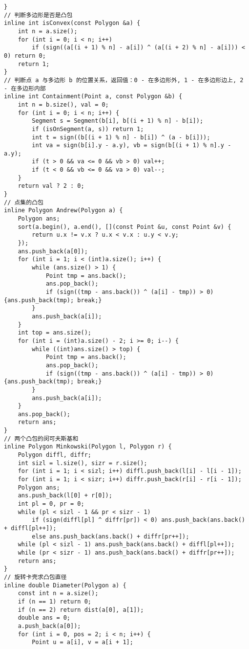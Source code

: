 \begin{verbatim}
}
// 判断多边形是否是凸包
inline int isConvex(const Polygon &a) {
    int n = a.size();
    for (int i = 0; i < n; i++)
        if (sign((a[(i + 1) % n] - a[i]) ^ (a[(i + 2) % n] - a[i])) < 0) return 0;
    return 1;
}
// 判断点 a 与多边形 b 的位置关系，返回值：0 - 在多边形外, 1 - 在多边形边上, 2 - 在多边形内部
inline int Containment(Point a, const Polygon &b) {
    int n = b.size(), val = 0;
    for (int i = 0; i < n; i++) {
        Segment s = Segment(b[i], b[(i + 1) % n] - b[i]);
        if (isOnSegment(a, s)) return 1;
        int t = sign((b[(i + 1) % n] - b[i]) ^ (a - b[i]));
        int va = sign(b[i].y - a.y), vb = sign(b[(i + 1) % n].y - a.y);
        if (t > 0 && va <= 0 && vb > 0) val++;
        if (t < 0 && vb <= 0 && va > 0) val--;
    }
    return val ? 2 : 0;
}
// 点集的凸包
inline Polygon Andrew(Polygon a) {
    Polygon ans;
    sort(a.begin(), a.end(), [](const Point &u, const Point &v) {
        return u.x != v.x ? u.x < v.x : u.y < v.y;
    });
    ans.push_back(a[0]);
    for (int i = 1; i < (int)a.size(); i++) {
        while (ans.size() > 1) {
            Point tmp = ans.back();
            ans.pop_back();
            if (sign((tmp - ans.back()) ^ (a[i] - tmp)) > 0) {ans.push_back(tmp); break;}
        }
        ans.push_back(a[i]);
    }
    int top = ans.size();
    for (int i = (int)a.size() - 2; i >= 0; i--) {
        while ((int)ans.size() > top) {
            Point tmp = ans.back();
            ans.pop_back();
            if (sign((tmp - ans.back()) ^ (a[i] - tmp)) > 0) {ans.push_back(tmp); break;}
        }
        ans.push_back(a[i]);
    }
    ans.pop_back();
    return ans;
}
// 两个凸包的闵可夫斯基和
inline Polygon Minkowski(Polygon l, Polygon r) {
    Polygon diffl, diffr;
    int sizl = l.size(), sizr = r.size();
    for (int i = 1; i < sizl; i++) diffl.push_back(l[i] - l[i - 1]);
    for (int i = 1; i < sizr; i++) diffr.push_back(r[i] - r[i - 1]);
    Polygon ans;
    ans.push_back(l[0] + r[0]);
    int pl = 0, pr = 0;
    while (pl < sizl - 1 && pr < sizr - 1)
        if (sign(diffl[pl] ^ diffr[pr]) < 0) ans.push_back(ans.back() + diffl[pl++]);
        else ans.push_back(ans.back() + diffr[pr++]);
    while (pl < sizl - 1) ans.push_back(ans.back() + diffl[pl++]);
    while (pr < sizr - 1) ans.push_back(ans.back() + diffr[pr++]);
    return ans;
}
// 旋转卡壳求凸包直径
inline double Diameter(Polygon a) {
    const int n = a.size();
    if (n == 1) return 0;
    if (n == 2) return dist(a[0], a[1]);
    double ans = 0;
    a.push_back(a[0]);
    for (int i = 0, pos = 2; i < n; i++) {
        Point u = a[i], v = a[i + 1];

\end{verbatim}
